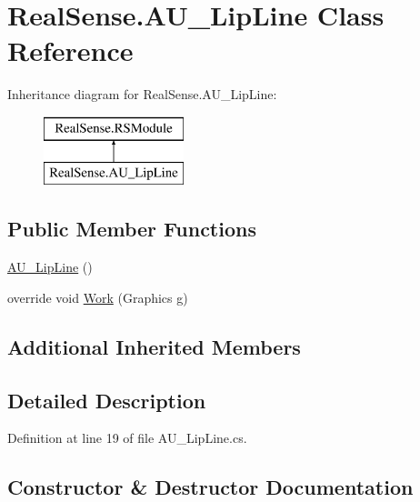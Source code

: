 \hypertarget{class_real_sense_1_1_a_u___lip_line}{}\section{Real\+Sense.\+A\+U\+\_\+\+Lip\+Line Class Reference}
\label{class_real_sense_1_1_a_u___lip_line}
Inheritance diagram for Real\+Sense.\+A\+U\+\_\+\+Lip\+Line\+:\begin{figure}[H]
\begin{center}
\leavevmode
\includegraphics[height=2.000000cm]{class_real_sense_1_1_a_u___lip_line}
\end{center}
\end{figure}
\subsection*{Public Member Functions}
\begin{DoxyCompactItemize}
\item 
\hyperlink{class_real_sense_1_1_a_u___lip_line_a3059aba79e0a4aee393f31503675355f}{A\+U\+\_\+\+Lip\+Line} ()
\item 
override void \hyperlink{class_real_sense_1_1_a_u___lip_line_ac511da241ef7448f552111e3c5365de1}{Work} (Graphics g)
\end{DoxyCompactItemize}
\subsection*{Additional Inherited Members}


\subsection{Detailed Description}


Definition at line 19 of file A\+U\+\_\+\+Lip\+Line.\+cs.



\subsection{Constructor \& Destructor Documentation}
\mbox{\label{class_real_sense_1_1_a_u___lip_line_a3059aba79e0a4aee393f31503675355f}} 
